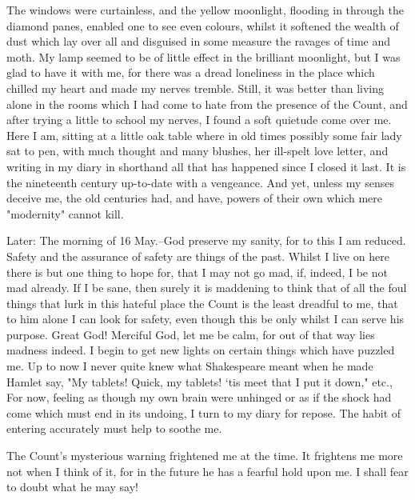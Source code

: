The windows were curtainless, and the yellow moonlight, flooding in through the diamond panes, enabled one to see even colours, whilst it softened the wealth of dust which lay over all and disguised in some measure the ravages of time and moth. My lamp seemed to be of little effect in the brilliant moonlight, but I was glad to have it with me, for there was a dread loneliness in the place which chilled my heart and made my nerves tremble. Still, it was better than living alone in the rooms which I had come to hate from the presence of the Count, and after trying a little to school my nerves, I found a soft quietude come over me. Here I am, sitting at a little oak table where in old times possibly some fair lady sat to pen, with much thought and many blushes, her ill-spelt love letter, and writing in my diary in shorthand all that has happened since I closed it last. It is the nineteenth century up-to-date with a vengeance. And yet, unless my senses deceive me, the old centuries had, and have, powers of their own which mere "modernity" cannot kill. 

Later: The morning of 16 May.--God preserve my sanity, for to this I am reduced. Safety and the assurance of safety are things of the past. Whilst I live on here there is but one thing to hope for, that I may not go mad, if, indeed, I be not mad already. If I be sane, then surely it is maddening to think that of all the foul things that lurk in this hateful place the Count is the least dreadful to me, that to him alone I can look for safety, even though this be only whilst I can serve his purpose. Great God! Merciful God, let me be calm, for out of that way lies madness indeed. I begin to get new lights on certain things which have puzzled me. Up to now I never quite knew what Shakespeare meant when he made Hamlet say, "My tablets! Quick, my tablets! `tis meet that I put it down," etc., For now, feeling as though my own brain were unhinged or as if the shock had come which must end in its undoing, I turn to my diary for repose. The habit of entering accurately must help to soothe me. 

The Count's mysterious warning frightened me at the time. It frightens me more not when I think of it, for in the future he has a fearful hold upon me. I shall fear to doubt what he may say! 


